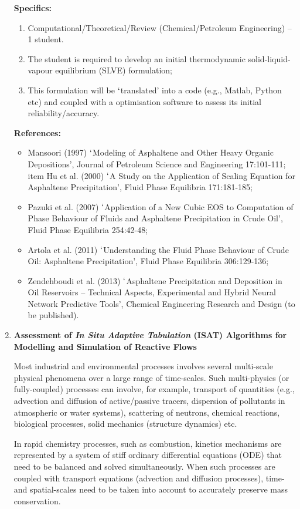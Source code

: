 \documentclass[12pts,a4paper,amsmath,amssymb,floatfix]{article}%
\begin{document}
\begin{enumerate}[label=\bfseries Project \arabic*:]
\noindent
{\bf Specifics:} 
\begin{enumerate}
\item Computational/Theoretical/Review (Chemical/Petroleum Engineering) -- 1 student.
\item The student is required to develop an initial thermodynamic solid-liquid-vapour equilibrium (SLVE) formulation;
\item This formulation will be $\lq$translated' into a code (e.g., Matlab, Python etc) and coupled with a optimisation software to assess its initial reliability/accuracy.
\end{enumerate}

\noindent
{\bf References:}
\begin{itemize}
\item Mansoori (1997) $\lq$Modeling of Asphaltene and Other Heavy Organic Depositions’, Journal of Petroleum Science and Engineering 17:101-111;
item Hu et al. (2000) $\lq$A Study on the Application of Scaling Equation for Asphaltene Precipitation’, Fluid Phase Equilibria 171:181-185;
\item Pazuki et al. (2007) $\lq$Application of a New Cubic EOS to Computation of Phase Behaviour of Fluids and Asphaltene Precipitation in Crude Oil’, Fluid Phase Equilibria 254:42-48;
\item Artola et al. (2011) $\lq$Understanding the Fluid Phase Behaviour of Crude Oil: Asphaltene Precipitation’, Fluid Phase Equilibria 306:129-136;
\item Zendehboudi et al. (2013) $\lq$Asphaltene Precipitation and Deposition in Oil Reservoirs – Technical Aspects, Experimental and Hybrid Neural Network Predictive Tools’, Chemical Engineering Research and Design (to be published). 
\end{itemize}


\clearpage
\item {\bf Assessment of {\it In Situ Adaptive Tabulation} (ISAT) Algorithms for Modelling and Simulation of Reactive Flows}

Most industrial and environmental processes involves several multi-scale physical phenomena over a large range of time-scales. Such multi-physics (or fully-coupled) processes can involve, for example, transport of quantities (e.g., advection and diffusion of active/passive tracers, dispersion of pollutants in atmospheric or water systems), scattering of neutrons, chemical reactions, biological processes, solid mechanics (structure dynamics) etc. 

In rapid chemistry processes, such as combustion, kinetics mechanisms are represented by a system of stiff ordinary differential equations (ODE) that need to be balanced and solved simultaneously. When such processes are coupled with transport equations (advection and diffusion processes), time- and spatial-scales need to be taken into account to accurately preserve mass conservation. 


\end{enumerate}
\end{document}
